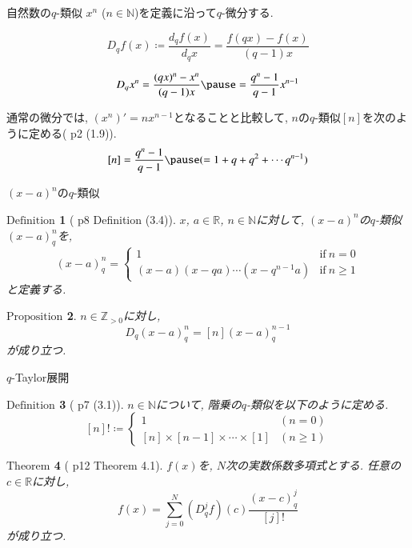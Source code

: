 \documentclass[dvipdfmx,cjk]{beamer}
\theoremstyle{mystyle}
\newtheorem{df}{$\textrm{Definition}$}[section]
\newtheorem{prop}[df]{$\textrm{Proposition}$}
\newtheorem{thm}[df]{$\textrm{Theorem}$}
\newcommand{\N}{\mathbb{N}}
\newcommand{\Z}{\mathbb{Z}}
\newcommand{\R}{\mathbb{R}}
\newcommand{\0}{\textbf{0}}
\begin{document}
\begin{frame}{自然数の$q$-類似}
	$x^n$ ($n \in \N$)を定義に沿って$q$-微分する. \pause
	\begin{screen}
		\[
			D_q f(x) \coloneqq \frac{d_q f(x)}{d_q x} = \frac{f(qx) - f(x)}{(q - 1) x}
		\]
	\end{screen} \pause
	\[
		D_q x^n = \frac{(qx)^n - x^n}{(q - 1) x} \pause
					= \frac{q^n - 1}{q - 1} x^{n - 1}
	\] \pause
  
  通常の微分では, $(x^n)' = n x^{n - 1}$となることと比較して, 
  $n$の$q$-類似$[n]$を次のように定める(\cite{Kac} p2 (1.9)). \pause
  \[
    [n] = \frac{q^n - 1}{q - 1} \pause
    (= 1 + q + q^2 + \cdots q^{n - 1})
  \]
\end{frame}

\begin{frame}{$(x - a)^n$の$q$-類似} 
	\begin{df}[\cite{Kac} p8 Definition (3.4)]
	  $x$, $a \in \R$, $n \in \N$に対して, $(x - a)^n$の$q$-類似$(x - a)^n_q$を, 
	  \[
	  (x - a)^n_q = \begin{cases}
	                      1 & \text{if}\ n = 0 \\
	                      (x - a) (x - qa) \cdots (x - q^{n - 1} a) & \text{if}\ n \ge 1
	                    \end{cases}
	  \]
	  と定義する. 
	\end{df} \pause
	\begin{prop} \label{Dq_qbinom_nonneg}
	  $n\in\Z_{>0}$に対し, 
	  \[
	    D_q(x-a)^n_q = [n](x-a)^{n-1}_q
	  \]
	  が成り立つ. 
	\end{prop}
\end{frame}

%

\begin{frame}{$q$-Taylor展開}
	\begin{df}[\cite{Kac} p7 (3.1)]
		$n \in \N$について, 階乗の$q$-類似を以下のように定める. 
    \[
      [n]! \coloneqq \begin{cases}
                            1 & (n=0)\\
                            [n]\times[n-1]\times\cdots\times[1] & (n\ge1)
                          \end{cases}
    \]
  \end{df} \pause
  \begin{thm}[\cite{Kac} p12 Theorem 4.1] \label{q_Taylor}
	 $f(x)$を, $N$次の実数係数多項式とする. 任意の$c\in\R$に対し, 
	 \[
	   f(x) = \sum_{j=0}^N (D_q^jf)(c)\frac{(x-c)^j_q}{[j]!}
	 \]
	 が成り立つ. 
  \end{thm}
\end{frame}
\end{document}

